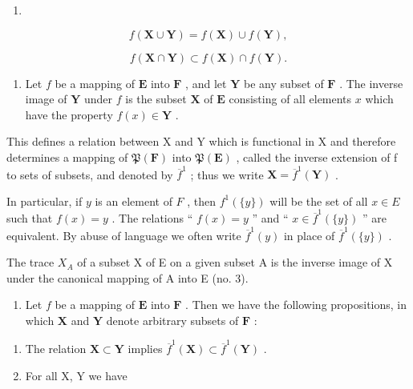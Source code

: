 \begin{enumerate}
\def\labelenumi{(\arabic{enumi})}
\setcounter{enumi}{10}
\tightlist
\item
\end{enumerate}

\[
f (\mathbf {X} \cup \mathbf {Y}) = f (\mathbf {X}) \cup f (\mathbf {Y}),\tag{12}
\]

\[
f (\mathbf {X} \cap \mathbf {Y}) \subset f (\mathbf {X}) \cap f (\mathbf {Y}).
\]

\begin{enumerate}
\def\labelenumi{\arabic{enumi}.}
\setcounter{enumi}{5}
\tightlist
\item
  Let \(f\) be a mapping of \(\mathbf{E}\) into \(\mathbf{F}\) , and let \(\mathbf{Y}\) be any subset of \(\mathbf{F}\) . The inverse image of \(\mathbf{Y}\) under \(f\) is the subset \(\mathbf{X}\) of \(\mathbf{E}\) consisting of all elements \(x\) which have the property \(f(x) \in \mathbf{Y}\) .
\end{enumerate}

This defines a relation between X and Y which is functional in X and therefore determines a mapping of \(\mathfrak{P}(\mathbf{F})\) into \(\mathfrak{P}(\mathbf{E})\) , called the inverse extension of f to sets of subsets, and denoted by \(\overline{f}^{1}\) ; thus we write \(\mathbf{X} = \overline{f}^{1}(\mathbf{Y})\) .

In particular, if \(y\) is an element of \(F\) , then \(f^{1}(\{y\})\) will be the set of all \(x \in E\) such that \(f(x) = y\) . The relations `` \(f(x) = y\) '' and `` \(x \in \overline{f}^{1}(\{y\})\) '' are equivalent. By abuse of language we often write \(\overline{f}^{1}(y)\) in place of \(\overline{f}^{1}(\{y\})\) .

The trace \(X_{A}\) of a subset X of E on a given subset A is the inverse image of X under the canonical mapping of A into E (no. 3).

\begin{enumerate}
\def\labelenumi{\arabic{enumi}.}
\setcounter{enumi}{6}
\tightlist
\item
  Let \(f\) be a mapping of \(\mathbf{E}\) into \(\mathbf{F}\) . Then we have the following propositions, in which \(\mathbf{X}\) and \(\mathbf{Y}\) denote arbitrary subsets of \(\mathbf{F}\) :
\end{enumerate}

\begin{enumerate}
\def\labelenumi{(\alph{enumi})}
\item
  The relation \(\mathbf{X} \subset \mathbf{Y}\) implies \(\overline{f}^1(\mathbf{X}) \subset \overline{f}^1(\mathbf{Y})\) .
\item
  For all X, Y we have
\end{enumerate}

